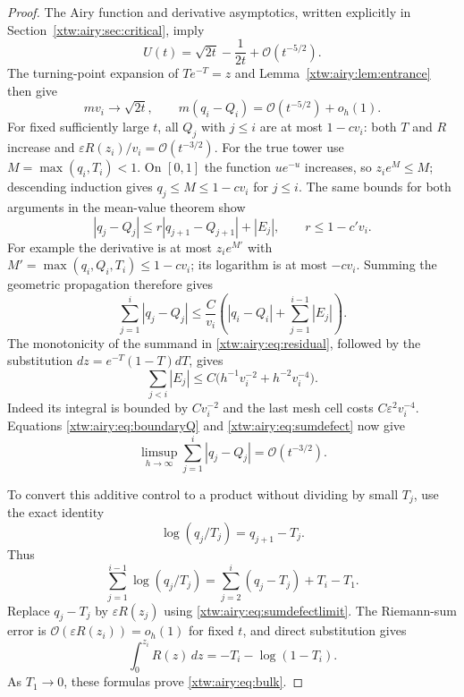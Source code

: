\documentclass[11pt]{article}
\theoremstyle{remark}\newtheorem{remark}[theorem]{Remark}
\newcommand{\OO}{\mathcal O}
\begin{document}
\begin{proof}
The Airy function and derivative asymptotics, written explicitly in
Section~\ref{xtw:airy:sec:critical}, imply
\begin{equation}\label{xtw:airy:eq:Ularge}
 U(t)=\sqrt{2t}-\frac1{2t}+\OO(t^{-5/2}).
\end{equation}
The turning-point expansion of $Te^{-T}=z$ and Lemma~\ref{xtw:airy:lem:entrance} then give
\begin{equation}\label{xtw:airy:eq:boundaryQ}
 mv_i\longrightarrow\sqrt{2t},\qquad
 m(q_i-Q_i)=\OO(t^{-5/2})+o_h(1).
\end{equation}
For fixed sufficiently large $t$, all $Q_j$ with $j\le i$ are at most
$1-cv_i$: both $T$ and $R$ increase and
$\varepsilon R(z_i)/v_i=\OO(t^{-3/2})$.
For the true tower use $M=\max(q_i,T_i)<1$.
On $[0,1]$ the function $u e^{-u}$ increases, so $z_i e^M\le M$; descending
induction gives $q_j\le M\le1-cv_i$ for $j\le i$.
The same bounds for both arguments in the mean-value theorem show
\[
 |q_j-Q_j|\le r|q_{j+1}-Q_{j+1}|+|E_j|,\qquad r\le1-c'v_i.
\]
For example the derivative is at most $z_i e^{M'}$ with
$M'=\max(q_i,Q_i,T_i)\le1-cv_i$; its logarithm is at most $-cv_i$.
Summing the geometric propagation therefore gives
\begin{equation}\label{xtw:airy:eq:sumdefect}
 \sum_{j=1}^i|q_j-Q_j|
 \le\frac C{v_i}\left(|q_i-Q_i|+\sum_{j=1}^{i-1}|E_j|\right).
\end{equation}
The monotonicity of the summand in \eqref{xtw:airy:eq:residual}, followed by the
substitution $dz=e^{-T}(1-T)dT$, gives
\[
 \sum_{j<i}|E_j|\le C\bigl(h^{-1}v_i^{-2}+h^{-2}v_i^{-4}\bigr).
\]
Indeed its integral is bounded by $C v_i^{-2}$ and the last mesh cell costs
$C\varepsilon^2v_i^{-4}$. Equations \eqref{xtw:airy:eq:boundaryQ} and
\eqref{xtw:airy:eq:sumdefect} now give
\begin{equation}\label{xtw:airy:eq:sumdefectlimit}
 \limsup_{h\to\infty}\sum_{j=1}^i|q_j-Q_j|=\OO(t^{-3/2}).
\end{equation}

To convert this additive control to a product without dividing by small $T_j$,
use the exact identity
\[
 \log(q_j/T_j)=q_{j+1}-T_j.
\]
Thus
\[
 \sum_{j=1}^{i-1}\log(q_j/T_j)
 =\sum_{j=2}^i(q_j-T_j)+T_i-T_1.
\]
Replace $q_j-T_j$ by $\varepsilon R(z_j)$ using
\eqref{xtw:airy:eq:sumdefectlimit}. The Riemann-sum error is
$\OO(\varepsilon R(z_i))=o_h(1)$ for fixed $t$, and direct substitution gives
\begin{equation}\label{xtw:airy:eq:Rintegral}
 \int_0^{z_i}R(z)\,dz=-T_i-\log(1-T_i).
\end{equation}
As $T_1\to0$, these formulas prove \eqref{xtw:airy:eq:bulk}.
\end{proof}
\end{document}
